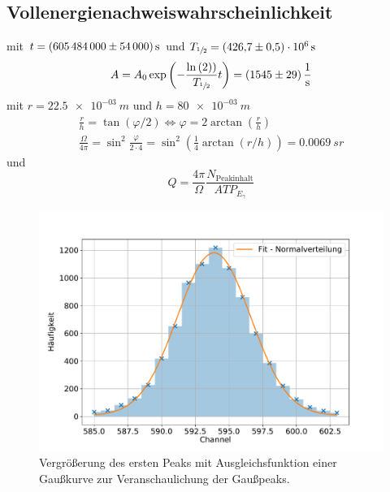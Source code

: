 \subsection{Vollenergienachweiswahrscheinlichkeit}
mit $t = \SI{605484000 (54000)}{s}$
und $T_{\sfrac{1}{2}} = \SI{426.7 (5) e+06}{s}$ \cite{nucleide}
\begin{equation}
	A = A_{0} \exp{\left( - \frac{\ln{(2))}}{T_{\sfrac{1}{2}}} t \right)} = \SI{1545(29)}{\per \second}
	\label{result:aktivität}
\end{equation}
mit $r=\SI{22.5e-03}{m}$
und $h = \SI{80e-03}{m}$
\begin{align*}
	\frac{r}{h} = \tan{( \varphi / 2 )} \Leftrightarrow \varphi = 2 \arctan{(\frac{r}{h})} \\
	\frac{\Omega}{4 \pi} = \sin^2{\frac{\varphi}{2 \cdot 4}} =  \sin^2{ \left( \frac{1}{4} \arctan{(r/h)} \right)} = \SI{0.0069}{sr}
	\label{result:raumwinkel}
\end{align*}
und
\begin{equation}
	Q = \frac{4 \pi}{\Omega} \frac{N_{\text{Peakinhalt}}}{ A T P_{E_{\gamma}}}
\end{equation}

\begin{figure}[h!]
  \centering
  \includegraphics[width=\textwidth]{content/images/einzelnergaussfit_0.pdf}
  \caption{Vergrößerung des ersten Peaks mit Ausgleichsfunktion einer Gaußkurve zur Veranschaulichung der Gaußpeaks.}
  \label{fig:vw}
\end{figure}



